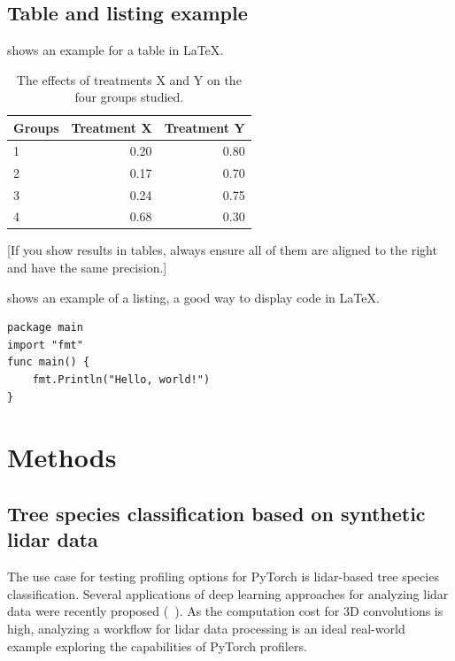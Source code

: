\documentclass[12pt, a4paper, hidelinks]{article}
\begin{document}
\subsection{Table and listing example}
 shows an example for a table in \LaTeX.
\begin{table}[th]
\label{tab:treatments}
\centering
\begin{tabularx}{0.45\textwidth}{l||r|r}
Groups & Treatment X & Treatment Y \\
\hline \hline
1 & 0.20 & 0.80\\
2 & 0.17 & 0.70\\
3 & 0.24 & 0.75\\
4 & 0.68 & 0.30\\
\end{tabularx}
\caption{The effects of treatments X and Y on the four groups studied.}
\end{table}

[If you show results in tables, always ensure all of them are aligned to the right and have the same precision.]

 shows an example of a listing, a good way to display code in \LaTeX.

\begin{listing}
\begin{verbatim}
package main
import "fmt"
func main() {
    fmt.Println("Hello, world!")
}
\end{verbatim}
\caption{"Hello, world!" in Go}
\label{lst:hello}
\end{listing}
\fi

\section{Methods}
\label{sec:methods}

\subsection{Tree species classification based on synthetic lidar data}
\label{sec:workflow}

The use case for testing profiling options for PyTorch is lidar-based tree species classification. 
Several applications of deep learning approaches for analyzing lidar data were recently proposed (~\cite{2017_qi_pointnet, 2021_krisanski_fsct}).
As the computation cost for 3D convolutions is high, analyzing a workflow for lidar data processing is an ideal real-world example exploring the capabilities of PyTorch profilers.
\end{document}
